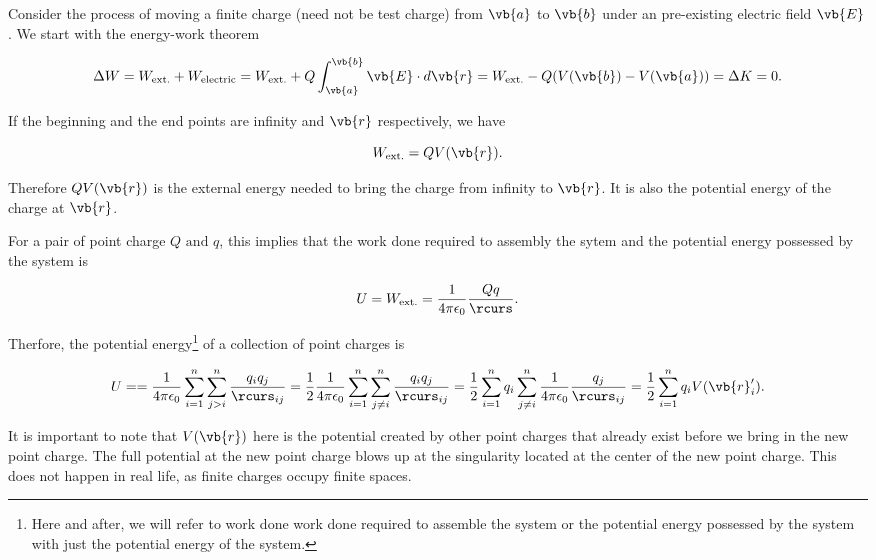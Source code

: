 \documentclass[english,a4paper,12pt]{report}
\begin{document}
Consider the process of moving a finite charge (need not be test charge) from \(\vb{a} \) to \(\vb{b} \) under an pre-existing electric field \(\vb{E} \). We start with the energy-work theorem

\begin{equation}
    \Delta W = W_{\text{ext.}} + W_{\text{electric}} = W_{\text{ext.}} + Q \int_{\vb{a} }^{\vb{b} } \vb{E} \cdot d\vb{r} = W_{\text{ext.}} - Q (V(\vb{b} ) - V(\vb{a} )) = \Delta K = 0.    
\end{equation}

If the beginning and the end points are infinity and \(\vb{r} \) respectively, we have

\begin{equation}
    W_{\text{ext.}} = QV(\vb{r} ). 
\end{equation}

Therefore \(QV(\vb{r} )\) is the external energy needed to bring the charge from infinity to \(\vb{r} \). It is also the potential energy of the charge at \(\vb{r} \). 

For a pair of point charge \(Q \text { and } q\), this implies that the work done required to assembly the sytem and the potential energy possessed by the system is 

\begin{equation}
    U = W_{\text{ext.}} = \frac{1}{4\pi \epsilon_0} \frac{Qq}{\rcurs }.
\end{equation}

Therfore, the potential energy\footnote{Here and after, we will refer to work done work done required to assemble the system or the potential energy possessed by the system with just the potential energy of the system.} of a collection of point charges is 

\begin{equation}
    U = = \frac{1}{4\pi\epsilon_0} \sum_{i=1}^{n} \sum_{j>i}^{n} \frac{q_{i} q_{j} }{\rcurs _{ij} }  = \frac{1}{2} \frac{1}{4\pi\epsilon_0} \sum_{i=1}^{n} \sum_{j\neq i}^{n} \frac{q_{i} q_{j} }{\rcurs _{ij} } = \frac{1}{2} \sum_{i=1}^{n} q_{i} \sum_{j\neq i}^{n} \frac{1}{4\pi\epsilon_0} \frac{q_{j} }{\rcurs _{ij} } = \frac{1}{2} \sum_{i=1}^{n} q_{i} V(\vb{r}_i '). \label{energy2} 
\end{equation}

It is important to note that \(V(\vb{r} )\) here is the potential created by other point charges that already exist before we bring in the new point charge. The full potential at the new point charge blows up at the singularity located at the center of the new point charge. This does not happen in real life, as finite charges occupy finite spaces. 
\end{document}
